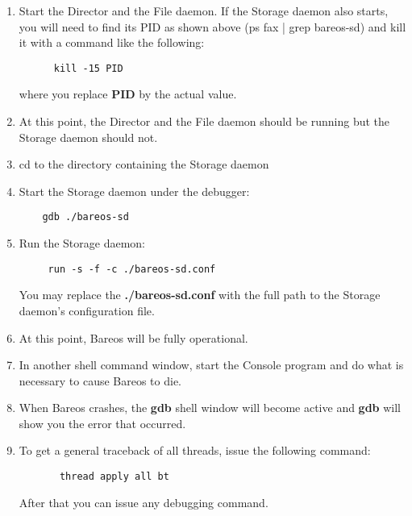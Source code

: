 \begin{enumerate}
\item Start the Director and the File daemon. If the  Storage daemon also
   starts, you will need to find its PID  as shown above (ps fax | grep
   bareos-sd) and kill it  with a command like the following:

\footnotesize
\begin{verbatim}
      kill -15 PID
\end{verbatim}
\normalsize

where you replace {\bf PID} by the actual value.

\item At this point, the Director and the File daemon should  be running but
   the Storage daemon should not.

\item cd to the directory containing the Storage daemon

\item Start the Storage daemon under the debugger:

   \footnotesize
\begin{verbatim}
    gdb ./bareos-sd
\end{verbatim}
\normalsize

\item Run the Storage daemon:

   \footnotesize
\begin{verbatim}
     run -s -f -c ./bareos-sd.conf
\end{verbatim}
\normalsize

You may replace the {\bf ./bareos-sd.conf} with the full path  to the Storage
daemon's configuration file.

\item At this point, Bareos will be fully operational.

\item In another shell command window, start the Console program  and do what
   is necessary to cause Bareos to die.

\item When Bareos crashes, the {\bf gdb} shell window will  become active and
   {\bf gdb} will show you the error that  occurred.

\item To get a general traceback of all threads, issue the following  command:


\footnotesize
\begin{verbatim}
       thread apply all bt
\end{verbatim}
\normalsize

After that you can issue any debugging command.
\end{enumerate}

